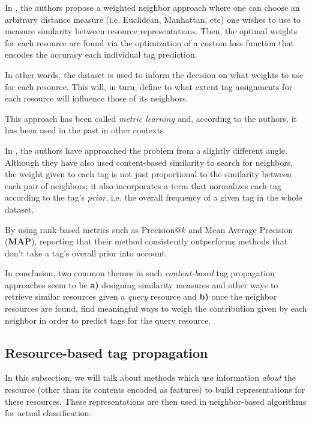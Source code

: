 In \cite{guillaumin_etal_2009}, the authors propose a weighted neighbor approach where one can choose an arbitrary distance measure (i.e. Euclidean, Manhattan, etc) one wishes to use to measure similarity between resource representations. Then, the optimal weights for each resource are found via the optimization of a custom loss function that encodes the accuracy each individual tag prediction. 

In other words, the dataset is used to inform the decision on what weights to use for each resource. This will, in turn, define to what extent tag assignments for each resource will influence those of its neighbors.

This approach has been called \textit{metric learning} and, according to the authors, it has been used in the past in other contexts.

In \cite{li_etal_2009}, the authors have approached the problem from a slightly different angle. Although they have also used content-based similarity to search for neighbors, the weight given to each tag is not just proportional to the similarity between each pair of neighbors; it also incorporates a term that normalizes each tag according to the tag's \textit{prior}, i.e. the overall frequency of a given tag in the whole dataset.

By using rank-based metrics such as Precision@$k$ and Mean Average Precision (\textbf{MAP}), reporting that their method consistently outperforms methods that don't take a tag's overall prior into account.

In conclusion, two common themes in such \textit{content-based} tag propagation approaches seem to be \textbf{a)} designing similarity measures and other ways to retrieve similar resources given a \textit{query} resource and \textbf{b)} once the neighbor resources are found, find meaningful ways to weigh the contribution given by each neighbor in order to predict tags for the query resource. 

\subsection{Resource-based tag propagation}

In this subsection, we will talk about methods which use information \textit{about} the resource (other than its contents encoded as features) to build representations for these resources. These representations are then used in neighbor-based algorithms for actual classification.

